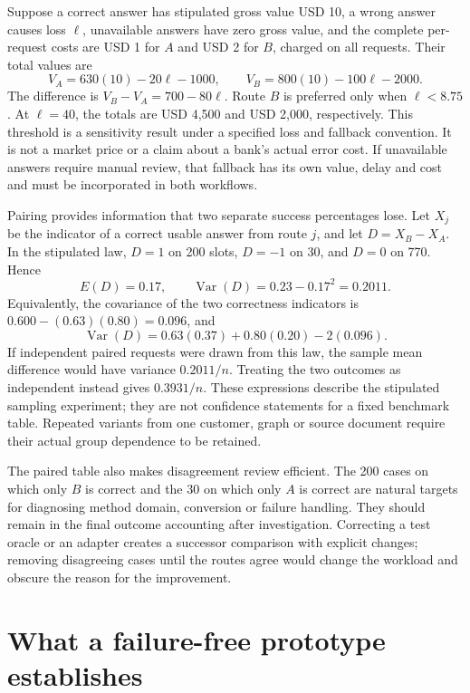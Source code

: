 Suppose a correct answer has stipulated gross value USD 10, a wrong answer
causes loss \(\ell\), unavailable answers have zero gross value, and the
complete per-request costs are USD 1 for \(A\) and USD 2 for \(B\), charged on
all requests. Their total values are
\[
 V_A=630(10)-20\ell-1000,\qquad
 V_B=800(10)-100\ell-2000.
\]
The difference is \(V_B-V_A=700-80\ell\). Route \(B\) is preferred only when
\(\ell<8.75\). At \(\ell=40\), the totals are USD 4,500 and USD 2,000,
respectively. This threshold is a sensitivity result under a specified loss
and fallback convention. It is not a market price or a claim about a bank's
actual error cost. If unavailable answers require manual review, that fallback
has its own value, delay and cost and must be incorporated in both workflows.
\citep{exec16_s10_exact}

Pairing provides information that two separate success percentages lose. Let
\(X_j\) be the indicator of a correct usable answer from route \(j\), and let
\(D=X_B-X_A\). In the stipulated law, \(D=1\) on 200 slots, \(D=-1\) on 30,
and \(D=0\) on 770. Hence
\[
 E(D)=0.17,\qquad
 \operatorname{Var}(D)=0.23-0.17^2=0.2011.
\]
Equivalently, the covariance of the two correctness indicators is
\(0.600-(0.63)(0.80)=0.096\), and
\[
 \operatorname{Var}(D)=0.63(0.37)+0.80(0.20)-2(0.096).
\]
If independent paired requests were drawn from this law, the sample mean
difference would have variance \(0.2011/n\). Treating the two outcomes as
independent instead gives \(0.3931/n\). These expressions describe the
stipulated sampling experiment; they are not confidence statements for a
fixed benchmark table. Repeated variants from one customer, graph or source
document require their actual group dependence to be retained.
\citep{exec16_s10_exact}

The paired table also makes disagreement review efficient. The 200 cases on
which only \(B\) is correct and the 30 on which only \(A\) is correct are
natural targets for diagnosing method domain, conversion or failure handling.
They should remain in the final outcome accounting after investigation.
Correcting a test oracle or an adapter creates a successor comparison with
explicit changes; removing disagreeing cases until the routes agree would
change the workload and obscure the reason for the improvement.

\section{What a failure-free prototype establishes}

